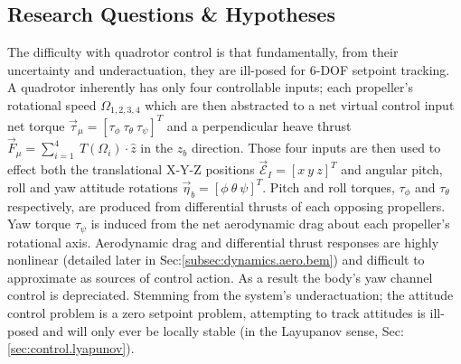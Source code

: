 \subsection{Research Questions \& Hypotheses}
\label{subsec:intro.foreword.hypotheses}
The difficulty with quadrotor control is that fundamentally, from their uncertainty and underactuation, they are ill-posed for 6-DOF setpoint tracking. A quadrotor inherently has only four controllable inputs; each propeller's rotational speed $\Omega_{1,2,3,4}$ which are then abstracted to a net virtual control input net torque $\vec{\tau}_\mu=[\tau_{\phi}~\tau_{\theta}~\tau_{\psi}]^T$ and a perpendicular heave thrust $\vec{F}_\mu=\sum_{i=1}^{4}~T(\Omega_i)\cdot\hat{z}$ in the $\hat{z}_b$ direction. Those four inputs are then used to effect both the translational X-Y-Z positions $\vec{\mathcal{E}}_I=[x~y~z]^T$ and angular pitch, roll and yaw attitude rotations $\vec{\eta}_b=[\phi~\theta~\psi]^T$. Pitch and roll torques, $\tau_{\phi}$ and $\tau_{\theta}$ respectively, are produced from differential thrusts of each opposing propellers. Yaw torque $\tau_{\psi}$ is induced from the net aerodynamic drag about each propeller's rotational axis. Aerodynamic drag and differential thrust responses are highly nonlinear (detailed later in Sec:\ref{subsec:dynamics.aero.bem}) and difficult to approximate as sources of control action. As a result the body's yaw channel control is depreciated. Stemming from the system's underactuation; the attitude control problem is a zero setpoint problem, attempting to track attitudes is ill-posed and will only ever be locally stable (in the Layupanov sense, Sec:\ref{sec:control.lyapunov}).
\par
